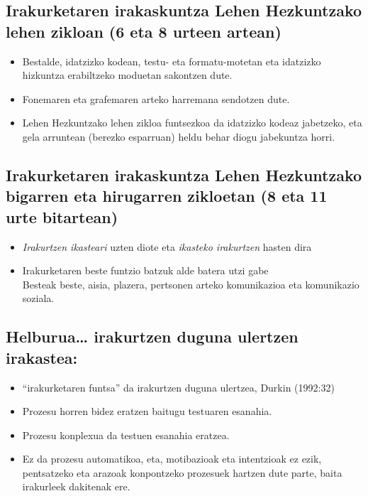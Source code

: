 \documentclass[]{book}
\providecommand{\tightlist}{%
  \setlength{\itemsep}{0pt}\setlength{\parskip}{0pt}}
\begin{document}
\hypertarget{irakurketaren-irakaskuntza-lehen-hezkuntzako-lehen-zikloan-6-eta-8-urteen-artean}{%
\subsection{Irakurketaren irakaskuntza Lehen Hezkuntzako lehen zikloan (6 eta 8 urteen artean)}\label{irakurketaren-irakaskuntza-lehen-hezkuntzako-lehen-zikloan-6-eta-8-urteen-artean}}

\begin{itemize}
\tightlist
\item
  Bestalde, idatzizko kodean, testu- eta formatu-motetan eta idatzizko hizkuntza erabiltzeko moduetan sakontzen dute.
\item
  Fonemaren eta grafemaren arteko harremana sendotzen dute.
\item
  Lehen Hezkuntzako lehen zikloa funtsezkoa da idatzizko kodeaz jabetzeko, eta gela arruntean (berezko esparruan) heldu behar diogu jabekuntza horri.
\end{itemize}

\hypertarget{irakurketaren-irakaskuntza-lehen-hezkuntzako-bigarren-eta-hirugarren-zikloetan-8-eta-11-urte-bitartean}{%
\subsection{Irakurketaren irakaskuntza Lehen Hezkuntzako bigarren eta hirugarren zikloetan (8 eta 11 urte bitartean)}\label{irakurketaren-irakaskuntza-lehen-hezkuntzako-bigarren-eta-hirugarren-zikloetan-8-eta-11-urte-bitartean}}

\begin{itemize}
\tightlist
\item
  \emph{Irakurtzen ikasteari} uzten diote eta \emph{ikasteko irakurtzen} hasten dira
\item
  Irakurketaren beste funtzio batzuk alde batera utzi gabe\\
  Besteak beste, aisia, plazera, pertsonen arteko komunikazioa eta komunikazio soziala.
\end{itemize}

\hypertarget{helburua-irakurtzen-duguna-ulertzen-irakastea}{%
\subsection{Helburua\ldots{} irakurtzen duguna ulertzen irakastea:}\label{helburua-irakurtzen-duguna-ulertzen-irakastea}}

\begin{itemize}
\tightlist
\item
  ``irakurketaren funtsa'' da irakurtzen duguna ulertzea, Durkin (1992:32)
\item
  Prozesu horren bidez eratzen baitugu testuaren esanahia.
\item
  Prozesu konplexua da testuen esanahia eratzea.
\item
  Ez da prozesu automatikoa, eta, motibazioak eta intentzioak ez ezik, pentsatzeko eta arazoak konpontzeko prozesuek hartzen dute parte, baita irakurleek dakitenak ere.
\end{itemize}
\end{document}
